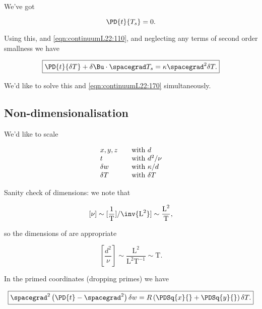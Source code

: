 We've got

\begin{equation}\label{eqn:continuumL22:210}
\PD{t}{T_s} = 0.
\end{equation}

Using this, and \ref{eqn:continuumL22:110}, and neglecting any terms of second order smallness we have

\begin{equation}\label{eqn:continuumL22:230}
\boxed{
\PD{t}{\delta T} + \delta \Bu \cdot \spacegrad T_s = \kappa \spacegrad^2 \delta T.
}
\end{equation}

We'd like to solve this and \ref{eqn:continuumL22:170} simultaneously.

\subsection{Non-dimensionalisation}

We'd like to scale

\begin{equation}\label{eqn:continuumL22:250}
\begin{array}{l l}
x,y,z & \quad \mbox{with $d$} \\
t & \quad \mbox{with $d^2/\nu$} \\
\delta w & \quad \mbox{with $\kappa/d$} \\
\delta T & \quad \mbox{with $\delta T$}
\end{array}
\end{equation}

Sanity check of dimensions: we note that

\begin{equation}\label{eqn:continuumL22:270}
[\nu] \sim [ \frac{1}{\text{T}} ]/ \inv{\text{L}^2} ] \sim \frac{\text{L}^2}{\text{T}},
\end{equation}

so the dimensions of are appropriate

\begin{equation}\label{eqn:continuumL22:290}
\left[\frac{d^2}{\nu}\right] \sim \frac{\text{L}^2}{\text{L}^2 \text{T}^{-1}} \sim \text{T}.
\end{equation}

In the primed coordinates (dropping primes) we have

\begin{equation}\label{eqn:continuumL22:310}
\boxed{
\spacegrad^2 \left( 
\PD{t} - \spacegrad^2 
\right)
\delta w
=
R \left( 
\PDSq{x}{}
+\PDSq{y}{}
\right) \delta T.
}
\end{equation}

